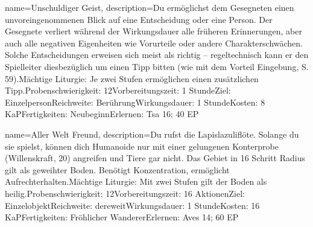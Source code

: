 {
    name={Unschuldiger Geist},
    description={Du ermöglichst dem Gesegneten einen unvoreingenommenen Blick auf eine Entscheidung oder eine Person. Der Gesegnete verliert während der Wirkungsdauer alle früheren Erinnerungen, aber auch alle negativen Eigenheiten wie Vorurteile oder andere Charakterschwächen. Solche Entscheidungen erweisen sich meist als richtig – regeltechnisch kann er den Spielleiter diesbezüglich um einen Tipp bitten (wie mit dem Vorteil Eingebung, S. 59).\newline Mächtige Liturgie: Je zwei Stufen ermöglichen einen zusätzlichen Tipp.\newline Probenschwierigkeit: 12\newline Vorbereitungszeit: 1 Stunde\newline Ziel: Einzelperson\newline Reichweite: Berührung\newline Wirkungsdauer: 1 Stunde\newline Kosten: 8 KaP\newline Fertigkeiten: Neubeginn\newline Erlernen: Tsa 16; 40 EP}
}


{
    name={Aller Welt Freund},
    description={Du rufst die Lapislazuliflöte. Solange du sie spielst, können dich Humanoide nur mit einer gelungenen Konterprobe (Willenskraft, 20) angreifen und Tiere gar nicht. Das Gebiet in 16 Schritt Radius gilt als geweihter Boden. Benötigt Konzentration, ermöglicht Aufrechterhalten.\newline Mächtige Liturgie: Mit zwei Stufen gilt der Boden als heilig.\newline Probenschwierigkeit: 12\newline Vorbereitungszeit: 16 Aktionen\newline Ziel: Einzelobjekt\newline Reichweite: dereweit\newline Wirkungsdauer: 1 Stunde\newline Kosten: 16 KaP\newline Fertigkeiten: Fröhlicher Wanderer\newline Erlernen: Aves 14; 60 EP}
}


